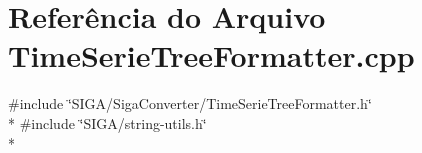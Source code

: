 \section{Referência do Arquivo Time\+Serie\+Tree\+Formatter.\+cpp}
\label{_time_serie_tree_formatter_8cpp}
{\ttfamily \#include \char`\"{}S\+I\+G\+A/\+Siga\+Converter/\+Time\+Serie\+Tree\+Formatter.\+h\char`\"{}}\\*
{\ttfamily \#include \char`\"{}S\+I\+G\+A/string-\/utils.\+h\char`\"{}}\\*
